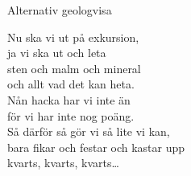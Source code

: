 \begin{song}{Alternativ geologvisa}
    
    

    Nu ska vi ut på exkursion,\\
    ja vi ska ut och leta\\
    sten och malm och mineral\\
    och allt vad det kan heta.\\
    Nån hacka har vi inte än\\
    för vi har inte nog poäng.\\
    Så därför så gör vi så lite vi kan,\\
    bara fikar och festar och kastar upp\\
    kvarts, kvarts, kvarts\ldots

\end{song}
